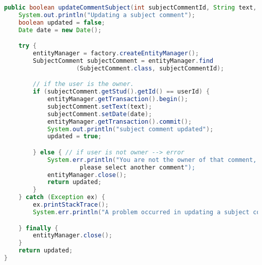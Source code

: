 \begin{lstlisting}[language=Java,  basicstyle=\footnotesize]
public boolean updateCommentSubject(int subjectCommentId, String text, int userId) {
	System.out.println("Updating a subject comment");
	boolean updated = false;
	Date date = new Date();

	try {
		entityManager = factory.createEntityManager();
		SubjectComment subjectComment = entityManager.find
					(SubjectComment.class, subjectCommentId);

		// if the user is the owner.
		if (subjectComment.getStud().getId() == userId) {
			entityManager.getTransaction().begin();
			subjectComment.setText(text);
			subjectComment.setDate(date);
			entityManager.getTransaction().commit();
			System.out.println("subject comment updated");
			updated = true;

		} else { // if user is not owner --> error
			System.err.println("You are not the owner of that comment,
					 please select another comment");
			entityManager.close();
			return updated;
		}
	} catch (Exception ex) {
		ex.printStackTrace();
		System.err.println("A problem occurred in updating a subject comment!");

	} finally {
		entityManager.close();
	}
	return updated;
}
\end{lstlisting}